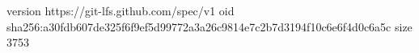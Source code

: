 version https://git-lfs.github.com/spec/v1
oid sha256:a30fdb607de325f6f9ef5d99772a3a26c9814e7c2b7d3194f10c6e6f4d0c6a5c
size 3753
